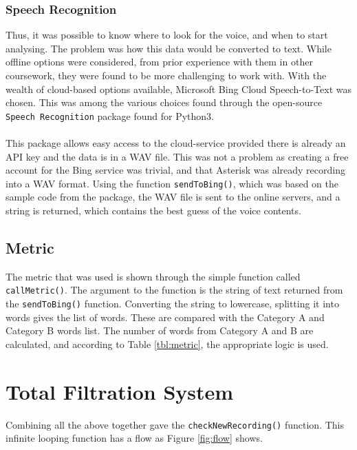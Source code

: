 \documentclass[main.tex]{subfiles}
\begin{document}
\subsubsection{Speech Recognition}
Thus, it was possible to know where to look for the voice, and when to start analysing. The problem was how this data would be converted to text. While offline options were considered, from prior experience with them in other coursework, they were found to be more challenging to work with. With the wealth of cloud-based options available, Microsoft Bing Cloud Speech-to-Text was chosen. This was among the various choices found through the open-source \texttt{Speech Recognition} package found for Python3.
\\\\
This package allows easy access to the cloud-service provided there is already an API key and the data is in a WAV file. This was not a problem as creating a free account for the Bing service was trivial, and that Asterisk was already recording into a WAV format. Using the function \texttt{sendToBing()}, which was based on the sample code from the package, the WAV file is sent to the online servers, and a string is returned, which contains the best guess of the voice contents.

\subsection{Metric}
The metric that was used is shown through the simple function called \texttt{callMetric()}. The argument to the function is the string of text returned from the \texttt{sendToBing()} function. Converting the string to lowercase, splitting it into words gives the list of words. These are compared with the Category A and Category B words list. The number of words from Category A and B are calculated, and according to Table \ref{tbl:metric}, the appropriate logic is used.

\section{Total Filtration System}
Combining all the above together gave the \texttt{checkNewRecording()} function. This infinite looping function has a flow as Figure \ref{fig:flow} shows.\\
\end{document}
